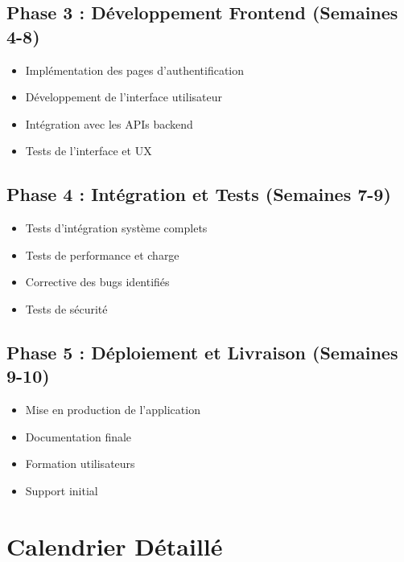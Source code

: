 \documentclass[12pt,a4paper,french]{report}
\begin{document}
\subsection{Phase 3 : Développement Frontend (Semaines 4-8)}

\begin{itemize}
    \item Implémentation des pages d'authentification
    \item Développement de l'interface utilisateur
    \item Intégration avec les APIs backend
    \item Tests de l'interface et UX
\end{itemize}

\subsection{Phase 4 : Intégration et Tests (Semaines 7-9)}

\begin{itemize}
    \item Tests d'intégration système complets
    \item Tests de performance et charge
    \item Corrective des bugs identifiés
    \item Tests de sécurité
\end{itemize}

\subsection{Phase 5 : Déploiement et Livraison (Semaines 9-10)}

\begin{itemize}
    \item Mise en production de l'application
    \item Documentation finale
    \item Formation utilisateurs
    \item Support initial
\end{itemize}

\section{Calendrier Détaillé}
\end{document}

